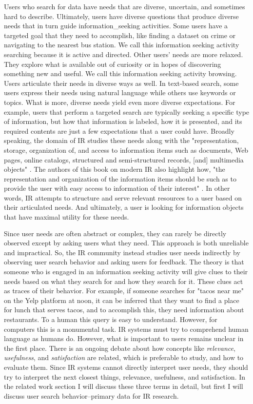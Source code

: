 Users who search for data have needs that are diverse, uncertain, and sometimes hard to describe. Ultimately, users have diverse questions that produce diverse needs that in turn guide \gls{information_seeking} activities. Some users have a targeted goal that they need to accomplish, like finding a dataset on crime or navigating to the nearest bus station. We call this information seeking activity searching because it is active and directed. Other users' needs are more relaxed. They explore what is available out of curiosity or in hopes of discovering something new and useful. We call this information seeking activity browsing. Users articulate their needs in diverse ways as well. In text-based search, some users express their needs using natural language while others use keywords or topics. What is more, diverse needs yield even more diverse expectations. For example, users that perform a targeted search are typically seeking a specific type of information, but how that information is labeled, how it is presented, and its required contents are just a few expectations that a user could have. Broadly speaking, the domain of IR studies these needs along with the "representation, storage, organization of, and access to information items such as documents, Web pages, online catalogs, structured and semi-structured records, [and] multimedia objects" \cite{Baeza-Yates1999}. The authors of this book on modern IR also highlight how, "the representation and organization of the information items should be such as to provide the user with easy access to information of their interest" \cite{Baeza-Yates1999}. In other words, IR attempts to structure and serve relevant resources to a user based on their articulated needs. And ultimately, a user is looking for information objects that have maximal utility for these needs.

Since user needs are often abstract or complex, they can rarely be directly observed except by asking users what they need. This approach is both unreliable and impractical. So, the IR community instead studies user needs indirectly by observing user search behavior and asking users for feedback. The theory is that someone who is engaged in an information seeking activity will give clues to their needs based on what they search for and how they search for it. These clues act as traces of their behavior. For example, if someone searches for "tacos near me" on the Yelp platform at noon, it can be inferred that they want to find a place for lunch that serves tacos, and to accomplish this, they need information about restaurants. To a human this query is easy to understand. However, for computers this is a monumental task. IR systems must try to comprehend human language as humans do. However, what is important to users remains unclear in the first place. There is an ongoing debate about how concepts like \emph{relevance}, \emph{usefulness}, and \emph{satisfaction} are related, which is preferable to study, and how to evaluate them. Since IR systems cannot directly interpret user needs, they should try to interpret the next closest things, relevance, usefulness, and satisfaction. In the related work section I will discuss these three terms in detail, but first I will discuss user search behavior–primary data for IR research.

